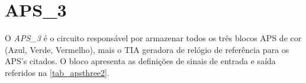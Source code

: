 \renewcommand{\NomeBloco}{APS\_3}
\renewcommand{\NomeBlocoNoUnderline}{apsthree}
\renewcommand{\NomePTab}{tab_\NomeBlocoNoUnderline}
\renewcommand{\NomeSTab}{tab_\NomeBlocoNoUnderline2}
\renewcommand{\NomePFig}{fig_\NomeBlocoNoUnderline}
\renewcommand{\NomeSFig}{fig_\NomeBlocoNoUnderline2}
\renewcommand{\NomeTTab}{tab_\NomeBlocoNoUnderline3}
\renewcommand{\NomeQTab}{tab_\NomeBlocoNoUnderline4}

\section{\NomeBloco}

O \emph{\NomeBloco} \'e o circuito respons\'avel por armazenar todos os tr\^es blocos APS de cor (Azul, Verde, Vermelho), mais o TIA geradora de rel\'ogio de refer\^encia para os APS's citados. O bloco apresenta as defini{\c c}\~oes de sinais de entrada e sa\'ida referidos na \autoref{\NomeSTab}.

